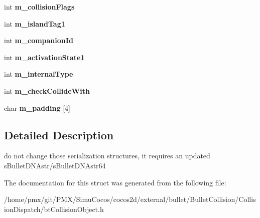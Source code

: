 \begin{DoxyCompactItemize}
\item 
\mbox{\label{structbtCollisionObjectFloatData_a7c7ef56132794c7b587177ef57736f63}} 
int {\bfseries m\+\_\+collision\+Flags}
\item 
\mbox{\label{structbtCollisionObjectFloatData_ade68696f6f3aafd3f68f45cb837696b1}} 
int {\bfseries m\+\_\+island\+Tag1}
\item 
\mbox{\label{structbtCollisionObjectFloatData_a476dda8d18eb7ed8f364aeb10c88b88d}} 
int {\bfseries m\+\_\+companion\+Id}
\item 
\mbox{\label{structbtCollisionObjectFloatData_a13d87925306d938efdd36bf09629093c}} 
int {\bfseries m\+\_\+activation\+State1}
\item 
\mbox{\label{structbtCollisionObjectFloatData_a265160a71ca617fbac9d9aced0d3da22}} 
int {\bfseries m\+\_\+internal\+Type}
\item 
\mbox{\label{structbtCollisionObjectFloatData_a82f62332fbae3214f10bce361bee417d}} 
int {\bfseries m\+\_\+check\+Collide\+With}
\item 
\mbox{\label{structbtCollisionObjectFloatData_ae728aae259f271617da310a2e86e7912}} 
char {\bfseries m\+\_\+padding} \mbox{[}4\mbox{]}
\end{DoxyCompactItemize}


\subsection{Detailed Description}
do not change those serialization structures, it requires an updated s\+Bullet\+D\+N\+Astr/s\+Bullet\+D\+N\+Astr64 

The documentation for this struct was generated from the following file\+:\begin{DoxyCompactItemize}
\item 
/home/pmx/git/\+P\+M\+X/\+Simu\+Cocos/cocos2d/external/bullet/\+Bullet\+Collision/\+Collision\+Dispatch/bt\+Collision\+Object.\+h\end{DoxyCompactItemize}
